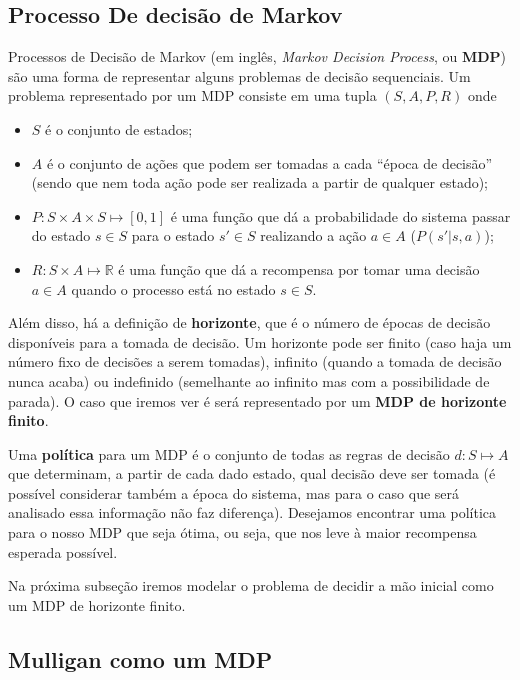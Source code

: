 \documentclass{book}
\begin{document}
\pagebreak
\subsection{Processo De decisão de Markov}
\label{ssec:mdp}

Processos de Decisão de Markov (em inglês, \textit{Markov Decision Process}, ou \textbf{MDP}) são uma forma de representar alguns problemas de decisão sequenciais. Um problema representado por um MDP consiste em
uma tupla $(S, A, P, R)$ onde
\begin{itemize}
  \item $S$ é o conjunto de estados;
  \item $A$ é o conjunto de ações que podem ser tomadas a cada ``época de decisão'' (sendo que nem toda ação pode ser realizada a partir de qualquer estado);
  \item $P: S \times A \times S \mapsto [0,1]$ é uma função que dá a probabilidade do sistema passar do estado $s \in S$ para o estado $s' \in S$
  realizando a ação $a \in A$ ($P(s'|s, a)$);
  \item $R: S \times A \mapsto \mathbb{R}$ é uma função que dá a recompensa por tomar uma decisão $a \in A$ quando o processo está no estado $s \in S$.
\end{itemize}

Além disso, há a definição de \textbf{horizonte}, que é o número de épocas de decisão disponíveis para a tomada de decisão. Um horizonte pode ser finito (caso haja
um número fixo de decisões a serem tomadas), infinito (quando a tomada de decisão nunca acaba) ou indefinido (semelhante ao infinito mas com a possibilidade de parada).
O caso que iremos ver é será representado por um \textbf{MDP de horizonte finito}.

Uma \textbf{política} para um MDP é o conjunto de todas as regras de decisão $d: S \mapsto A$ que determinam, a partir de cada dado estado, qual decisão deve ser tomada
(é possível considerar também a época do sistema, mas para o caso que será analisado essa informação não faz diferença). Desejamos encontrar uma política para o
nosso MDP que seja ótima, ou seja, que nos leve à maior recompensa esperada possível.

Na próxima subseção iremos modelar o problema de decidir a mão inicial como um MDP de horizonte finito.

\subsection{Mulligan como um MDP}
\end{document}
